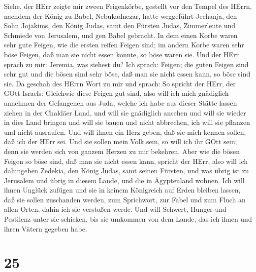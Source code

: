  Siehe, der HErr zeigte mir zween Feigenkörbe, gestellt vor
den Tempel des HErrn, nachdem der König zu Babel, Nebukadnezar, hatte
weggeführt Jechanja, den Sohn Jojakims, den König Judas, samt den
Fürsten Judas, Zimmerleute und Schmiede von Jerusalem, und gen Babel
gebracht.  In dem einen Korbe waren sehr gute Feigen, wie
die ersten reifen Feigen sind; im andern Korbe waren sehr böse Feigen,
daß man sie nicht essen konnte, so böse waren sie.  Und der
HErr sprach zu mir: Jeremia, was siehest du? Ich sprach: Feigen; die
guten Feigen sind sehr gut und die bösen sind sehr böse, daß man sie
nicht essen kann, so böse sind sie.  Da geschah des HErrn
Wort zu mir und sprach:  So spricht der HErr, der GOtt
Israels: Gleichwie diese Feigen gut sind, also will ich mich gnädiglich
annehmen der Gefangenen aus Juda, welche ich habe aus dieser Stätte
lassen ziehen in der Chaldäer Land,  und will sie gnädiglich
ansehen und will sie wieder in dies Land bringen und will sie bauen und
nicht abbrechen, ich will sie pflanzen und nicht ausraufen. 
Und will ihnen ein Herz geben, daß sie mich kennen sollen, daß ich der
HErr sei. Und sie sollen mein Volk sein, so will ich ihr GOtt sein; denn
sie werden sich von ganzem Herzen zu mir bekehren.  Aber wie
die bösen Feigen so böse sind, daß man sie nicht essen kann, spricht der
HErr, also will ich dahingeben Zedekia, den König Judas, samt seinen
Fürsten, und was übrig ist zu Jerusalem und übrig in diesem Lande, und
die in Ägyptenland wohnen.  Ich will ihnen Unglück zufügen
und sie in keinem Königreich auf Erden bleiben lassen, daß sie sollen
zuschanden werden, zum Sprichwort, zur Fabel und zum Fluch an allen
Orten, dahin ich sie verstoßen werde.  Und will Schwert,
Hunger und Pestilenz unter sie schicken, bis sie umkommen von dem Lande,
das ich ihnen und ihren Vätern gegeben habe.

\hypertarget{section-24}{%
\section{25}\label{section-24}}

